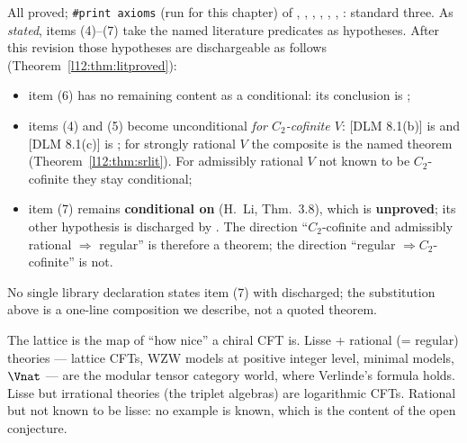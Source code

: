\begin{status}
All proved; \texttt{\#print axioms} (run for this chapter) of ,
, ,
, ,
, :
standard three. As \emph{stated}, items (4)--(7) take the named literature predicates as hypotheses. After this revision
those hypotheses are dischargeable as follows (Theorem~\ref{l12:thm:litproved}):
\begin{itemize}
\item item (6) has no remaining content as a conditional: its conclusion is ;
\item items (4) and (5) become unconditional \emph{for $C_2$-cofinite $V$}: [DLM 8.1(b)] is
   and [DLM 8.1(c)] is ;
  for strongly rational $V$ the composite is the named theorem 
  (Theorem~\ref{l12:thm:srlit}). For admissibly rational $V$ not known to be $C_2$-cofinite they stay conditional;
\item item (7) remains \textbf{conditional on } (H.~Li, Thm.~3.8), which is \textbf{unproved}; its
  other hypothesis  is discharged by . The direction ``$C_2$-cofinite and
  admissibly rational $\Rightarrow$ regular'' is therefore a theorem; the direction ``regular $\Rightarrow C_2$-cofinite'' is not.
\end{itemize}
No single library declaration states item (7) with  discharged; the substitution above is a one-line composition
we describe, not a quoted theorem.
\end{status}

\begin{physics}
The lattice is the map of ``how nice'' a chiral CFT is. Lisse + rational (= regular) theories --- lattice CFTs, WZW models
at positive integer level, minimal models, $\Vnat$ --- are the modular tensor category world, where Verlinde's formula
holds. Lisse but irrational theories (the triplet algebras) are logarithmic CFTs. Rational but not known to be lisse: no
example is known, which is the content of the open conjecture.
\end{physics}

